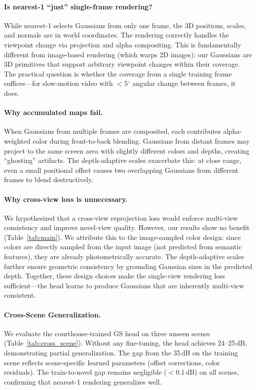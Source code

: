 \documentclass[10pt,twocolumn]{article}
\begin{document}
\paragraph{Is nearest-1 ``just'' single-frame rendering?}
While nearest-1 selects Gaussians from only one frame, the 3D positions, scales, and normals are in world coordinates.
The rendering correctly handles the viewpoint change via projection and alpha compositing.
This is fundamentally different from image-based rendering (which warps 2D images): our Gaussians are 3D primitives that support arbitrary viewpoint changes within their coverage.
The practical question is whether the coverage from a single training frame suffices---for slow-motion video with $<$5$^\circ$ angular change between frames, it does.

\paragraph{Why accumulated maps fail.}
When Gaussians from multiple frames are composited, each contributes alpha-weighted color during front-to-back blending.
Gaussians from distant frames may project to the same screen area with slightly different colors and depths, creating ``ghosting'' artifacts.
The depth-adaptive scales exacerbate this: at close range, even a small positional offset causes two overlapping Gaussians from different frames to blend destructively.

\paragraph{Why cross-view loss is unnecessary.}
We hypothesized that a cross-view reprojection loss would enforce multi-view consistency and improve novel-view quality.
However, our results show no benefit (Table~\ref{tab:main}).
We attribute this to the image-sampled color design: since colors are directly sampled from the input image (not predicted from semantic features), they are already photometrically accurate.
The depth-adaptive scales further ensure geometric consistency by grounding Gaussian sizes in the predicted depth.
Together, these design choices make the single-view rendering loss sufficient---the head learns to produce Gaussians that are inherently multi-view consistent.

\paragraph{Cross-Scene Generalization.}
We evaluate the courthouse-trained GS head on three unseen scenes (Table~\ref{tab:cross_scene}).
Without any fine-tuning, the head achieves 24--25\,dB, demonstrating partial generalization.
The gap from the 35\,dB on the training scene reflects scene-specific learned parameters (offset corrections, color residuals).
The train-to-novel gap remains negligible ($<$0.1\,dB) on all scenes, confirming that nearest-1 rendering generalizes well.
\end{document}

